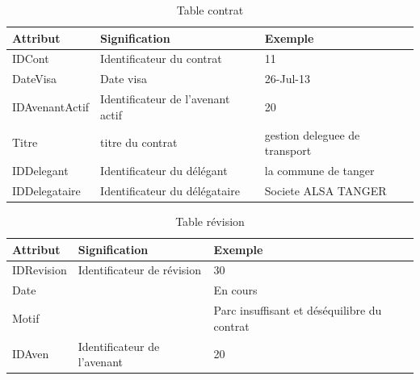 \documentclass[a4paper]{report}
\begin{document}
\begin{doublespace}
	\begin{table}[H]
		\begin{center}
			\begin{tabularx}{17.5cm}{|X|X|X|}
				\hline
				\textbf{Attribut} & \textbf{Signification}            &
				\textbf{Exemple}                                                            \\
				\hline
				IDCont            & Identificateur du contrat         & 11                  \\
				\hline
				DateVisa          & Date visa                         & 26-Jul-13           \\
				\hline
				IDAvenantActif    & Identificateur de l'avenant actif &
				20                                                                          \\
				\hline
				Titre             & titre du contrat                  & gestion deleguee de
				transport                                                                   \\
				\hline
				IDDelegant        & Identificateur du délégant        & la commune de
				tanger                                                                      \\
				\hline
				IDDelegataire     & Identificateur du délégataire     & Societe ALSA
				TANGER                                                                      \\
				\hline
			\end{tabularx}
			\caption{Table contrat}
		\end{center}
	\end{table}

	\begin{table}[H]
	
		\begin{center}
			\begin{tabularx}{17cm}{|p{4cm}|p{4cm}|X|}
				\hline
				\textbf{Attribut} & \textbf{Signification}      &
				\textbf{Exemple}                                                                              \\
				\hline
				IDRevision        & Identificateur de révision  & 30                                          \\
				\hline
				Date              &                             & En cours                                    \\
				\hline
				Motif             &                             & Parc insuffisant et déséquilibre du contrat \\
				\hline
				IDAven            & Identificateur de l'avenant & 20                                          \\
				\hline
			\end{tabularx}
			\caption{Table révision}
		\end{center}
	\end{table}


\end{doublespace}
\end{document}
